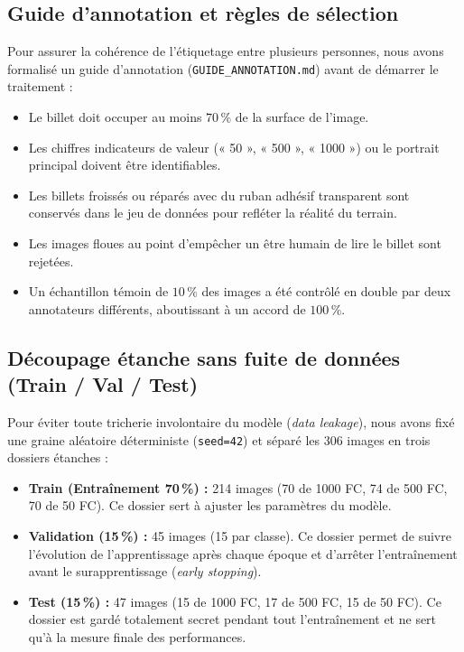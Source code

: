 \documentclass[11pt,a4paper]{article}
\begin{document}
\subsection{Guide d'annotation et règles de sélection}
Pour assurer la cohérence de l'étiquetage entre plusieurs personnes, nous avons formalisé un guide d'annotation (\texttt{GUIDE\_ANNOTATION.md}) avant de démarrer le traitement :
\begin{itemize}
    \item Le billet doit occuper au moins $70\,\%$ de la surface de l'image.
    \item Les chiffres indicateurs de valeur (« 50 », « 500 », « 1000 ») ou le portrait principal doivent être identifiables.
    \item Les billets froissés ou réparés avec du ruban adhésif transparent sont conservés dans le jeu de données pour refléter la réalité du terrain.
    \item Les images floues au point d'empêcher un être humain de lire le billet sont rejetées.
    \item Un échantillon témoin de $10\,\%$ des images a été contrôlé en double par deux annotateurs différents, aboutissant à un accord de $100\,\%$.
\end{itemize}

\subsection{Découpage étanche sans fuite de données (Train / Val / Test)}
Pour éviter toute tricherie involontaire du modèle (\textit{data leakage}), nous avons fixé une graine aléatoire déterministe (\texttt{seed=42}) et séparé les 306 images en trois dossiers étanches :
\begin{itemize}
    \item \textbf{Train (Entraînement 70\,\%) :} 214 images (70 de 1000 FC, 74 de 500 FC, 70 de 50 FC). Ce dossier sert à ajuster les paramètres du modèle.
    \item \textbf{Validation (15\,\%) :} 45 images (15 par classe). Ce dossier permet de suivre l'évolution de l'apprentissage après chaque époque et d'arrêter l'entraînement avant le surapprentissage (\textit{early stopping}).
    \item \textbf{Test (15\,\%) :} 47 images (15 de 1000 FC, 17 de 500 FC, 15 de 50 FC). Ce dossier est gardé totalement secret pendant tout l'entraînement et ne sert qu'à la mesure finale des performances.
\end{itemize}
\end{document}
